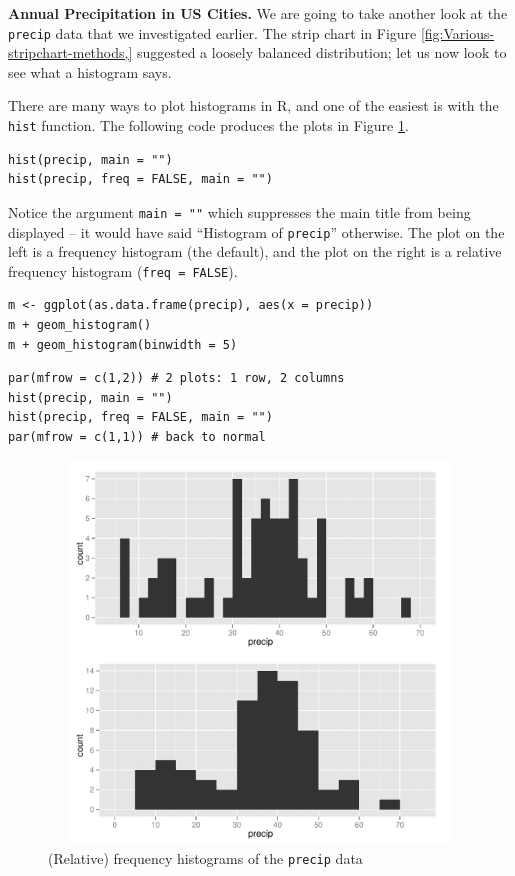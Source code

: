 \documentclass[captions=tableheading]{scrbook}
\begin{document}
\begin{example}
\textbf{Annual Precipitation in US Cities.} We are going to take another look at the \texttt{precip} data that we investigated earlier. The strip chart in Figure \ref{fig:Various-stripchart-methods,} suggested a loosely balanced distribution; let us now look to see what a histogram says. 

There are many ways to plot histograms in \textsf{R}, and one of the easiest is with the \texttt{hist} function. The following code produces the plots in Figure \ref{fig:histograms}.


\begin{verbatim}
hist(precip, main = "")
hist(precip, freq = FALSE, main = "")
\end{verbatim}

Notice the argument \texttt{main = ""} which suppresses the main title from being displayed -- it would have said ``Histogram of \texttt{precip}'' otherwise. The plot on the left is a frequency histogram (the default), and the plot on the right is a relative frequency histogram (\texttt{freq = FALSE}). 


\begin{verbatim}
m <- ggplot(as.data.frame(precip), aes(x = precip))
m + geom_histogram()
m + geom_histogram(binwidth = 5)
\end{verbatim}




\begin{verbatim}
par(mfrow = c(1,2)) # 2 plots: 1 row, 2 columns
hist(precip, main = "")
hist(precip, freq = FALSE, main = "")
par(mfrow = c(1,1)) # back to normal
\end{verbatim}



\begin{figure}[th]
    \includegraphics[width=5in, height=4in]{img/histograms.pdf}
    \caption{(Relative) frequency histograms of the \texttt{precip} data}
    \label{fig:histograms}
  \end{figure}

\end{example}
\end{document}
